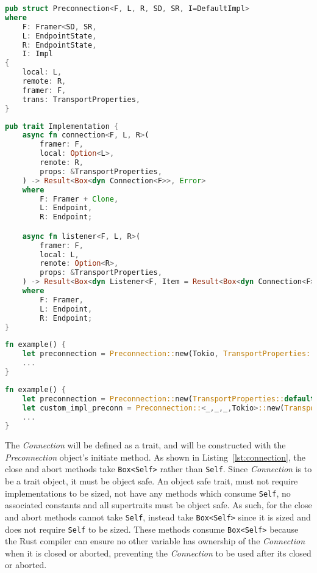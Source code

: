 \documentclass{l4proj}
\begin{document}
\begin{lstlisting}[language=Rust, float=h, label=lst:preconnection, caption={The Preconnection struct, showing the four
    generic parameters.}]
pub struct Preconnection<F, L, R, SD, SR, I=DefaultImpl>
where
    F: Framer<SD, SR,
    L: EndpointState,
    R: EndpointState,
    I: Impl
{
    local: L,
    remote: R,
    framer: F,
    trans: TransportProperties,
}
\end{lstlisting}

\begin{lstlisting}[language=Rust, float=h, label=lst:impl, caption={The Implementation trait.}]
pub trait Implementation {
    async fn connection<F, L, R>(
        framer: F,
        local: Option<L>,
        remote: R,
        props: &TransportProperties,
    ) -> Result<Box<dyn Connection<F>>, Error>
    where
        F: Framer + Clone,
        L: Endpoint,
        R: Endpoint;

    async fn listener<F, L, R>(
        framer: F,
        local: L,
        remote: Option<R>,
        props: &TransportProperties,
    ) -> Result<Box<dyn Listener<F, Item = Result<Box<dyn Connection<F>>, Error>>>, Error>
    where
        F: Framer,
        L: Endpoint,
        R: Endpoint;
}
\end{lstlisting}

\begin{lstlisting}[language=Rust, float=h, label=lst:preconnBad, caption={An example of how to construct a
Preconnection if the Implementation trait is to be passed when the Preconnection is constructed}]
fn example() {
    let preconnection = Preconnection::new(Tokio, TransportProperties::default(), ...);
    ...
}
\end{lstlisting}

\begin{lstlisting}[language=Rust, float=h, label=lst:preconnGood, caption={An example of how to construct a
    Preconnection if the Implementation trait is used as a marker.}]
fn example() {
    let preconnection = Preconnection::new(TransportProperties::default(), ...);
    let custom_impl_preconn = Preconnection::<_,_,_,Tokio>::new(TransportProperties::default(), ...);
    ...
}
\end{lstlisting}

The \emph{Connection} will be defined as a trait, and will be constructed with the \emph{Preconnection} object's
initiate method.
As shown in Listing~\ref{lst:connection}, the close and abort methods take \texttt{Box<Self>} rather than \texttt{Self}.
Since \emph{Connection} is to be a trait object, it must be object safe.
An object safe trait, must not require implementations to be sized, not have any methods which consume \texttt{Self}, no
associated constants and all supertraits must be object safe.
As such, for the close and abort methods cannot take \texttt{Self}, instead take \texttt{Box<Self>} since it is sized
and does not require \texttt{Self} to be sized.
These methods consume \texttt{Box<Self>} because the Rust compiler can ensure no other variable has ownership of the
\emph{Connection} when it is closed or aborted, preventing the \emph{Connection} to be used after its closed or aborted.
\end{document}

